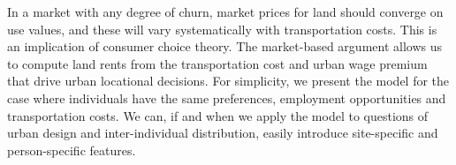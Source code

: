






 In a market with any degree of churn, market prices for land should converge on use values, and these will vary systematically with transportation costs. This is an implication of consumer choice theory. The market-based argument allows us to compute land rents from the transportation cost and urban wage premium that drive urban locational decisions. 
For simplicity, we present the model for the case where individuals have the same preferences, employment opportunities and transportation costs. We can, if and when we apply the model to questions of urban design and inter-individual distribution, easily introduce site-specific and person-specific features.  

